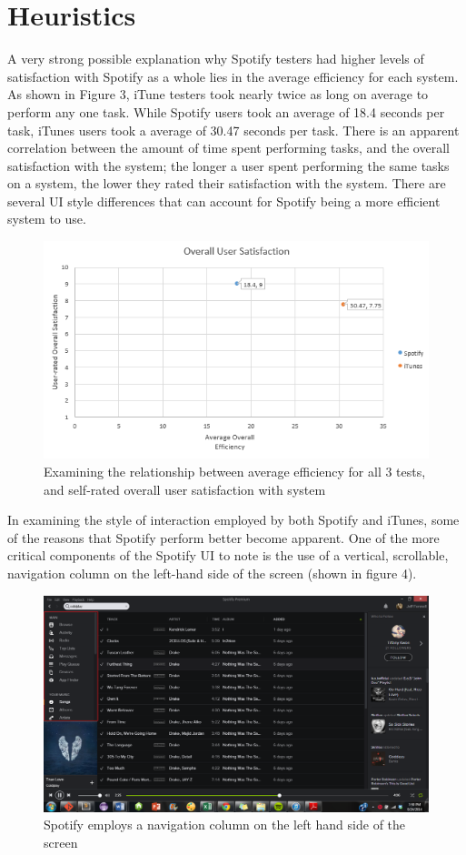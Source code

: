 \documentclass[12pt]{report}
\begin{document}
\section{Heuristics}

A very strong possible explanation why Spotify testers had higher levels of satisfaction with Spotify as a whole lies in the average efficiency for each system. As shown in Figure 3, iTune testers took nearly twice as long on average to perform any one task. While Spotify users took an average of 18.4 seconds per task, iTunes users took a average of 30.47 seconds per task. There is an apparent correlation between the amount of time spent performing tasks, and the overall satisfaction with the system; the longer a user spent performing the same tasks on a system, the lower they rated their satisfaction with the system. There are several UI style differences that can account for Spotify being a more efficient system to use.

\begin{figure}[H]
	\centering
	\includegraphics[width=.75\textwidth]{chart3.png}
	\caption{Examining the relationship between average efficiency for all 3 tests, and self-rated overall user satisfaction with system}
\end{figure}

In examining the style of interaction employed by both Spotify and iTunes, some of the reasons that Spotify perform better become apparent. One of the more critical components of the Spotify UI to note is the use of a vertical, scrollable, navigation column on the left-hand side of the screen (shown in figure 4). 

\begin{figure}[H]
	\centering
	\includegraphics[width=\textwidth]{chart4.png}
	\caption{Spotify employs a navigation column on the left hand side of the screen}
\end{figure}
\end{document}

